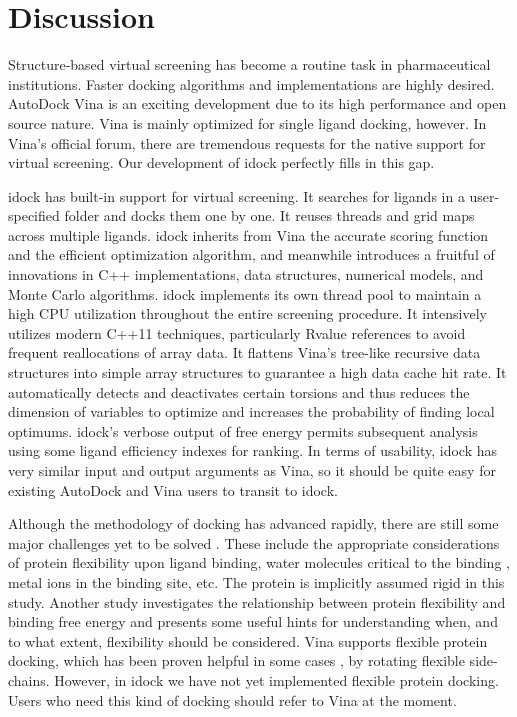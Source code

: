 \section{Discussion}

Structure-based virtual screening has become a routine task in pharmaceutical institutions. Faster docking algorithms and implementations are highly desired. AutoDock Vina \citep{595} is an exciting development due to its high performance and open source nature. Vina is mainly optimized for single ligand docking, however. In Vina's official forum, there are tremendous requests for the native support for virtual screening. Our development of idock perfectly fills in this gap.

idock has built-in support for virtual screening. It searches for ligands in a user-specified folder and docks them one by one. It reuses threads and grid maps across multiple ligands. idock inherits from Vina the accurate scoring function and the efficient optimization algorithm, and meanwhile introduces a fruitful of innovations in C++ implementations, data structures, numerical models, and Monte Carlo algorithms. idock implements its own thread pool to maintain a high CPU utilization throughout the entire screening procedure. It intensively utilizes modern C++11 techniques, particularly Rvalue references to avoid frequent reallocations of array data. It flattens Vina's tree-like recursive data structures into simple array structures to guarantee a high data cache hit rate. It automatically detects and deactivates certain torsions and thus reduces the dimension of variables to optimize and increases the probability of finding local optimums. idock's verbose output of free energy permits subsequent analysis using some ligand efficiency indexes \citep{337,336,335} for ranking. In terms of usability, idock has very similar input and output arguments as Vina, so it should be quite easy for existing AutoDock and Vina users to transit to idock.

Although the methodology of docking has advanced rapidly, there are still some major challenges yet to be solved \citep{493}. These include the appropriate considerations of protein flexibility upon ligand binding, water molecules critical to the binding \citep{1343,970}, metal ions in the binding site, etc. The protein is implicitly assumed rigid in this study. Another study \citep{1397} investigates the relationship between protein flexibility and binding free energy and presents some useful hints for understanding when, and to what extent, flexibility should be considered. Vina supports flexible protein docking, which has been proven helpful in some cases \citep{1084}, by rotating flexible side-chains. However, in idock we have not yet implemented flexible protein docking. Users who need this kind of docking should refer to Vina at the moment.

